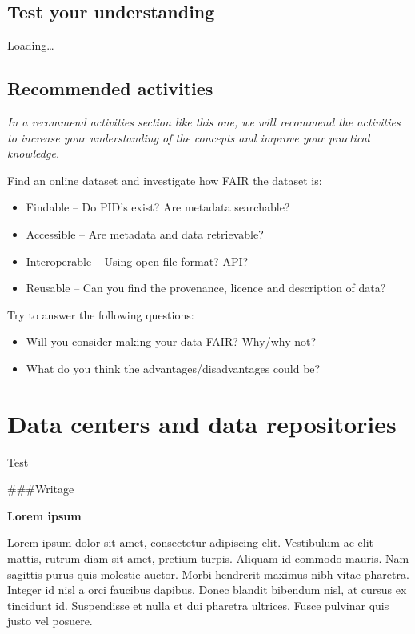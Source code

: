 \documentclass[
]{book}
\providecommand{\tightlist}{%
  \setlength{\itemsep}{0pt}\setlength{\parskip}{0pt}}
\begin{document}
\hypertarget{test-your-understanding}{%
\section{Test your understanding}\label{test-your-understanding}}

Loading\ldots{}

\hypertarget{recommended-activities}{%
\section{Recommended activities}\label{recommended-activities}}

\leavevmode{}%
\emph{In a recommend activities section like this one, we will recommend the activities to increase your understanding of the concepts and improve your practical knowledge.}

Find an online dataset and investigate how FAIR the dataset is:

\begin{itemize}
\tightlist
\item
  Findable -- Do PID's exist? Are metadata searchable?
\item
  Accessible -- Are metadata and data retrievable?
\item
  Interoperable -- Using open file format? API?
\item
  Reusable -- Can you find the provenance, licence and description of data?
\end{itemize}

Try to answer the following questions:

\begin{itemize}
\tightlist
\item
  Will you consider making your data FAIR? Why/why not?
\item
  What do you think the advantages/disadvantages could be?
\end{itemize}

\hypertarget{data-centers-and-data-repositories}{%
\chapter{Data centers and data repositories}\label{data-centers-and-data-repositories}}

Test

\#\#\#Writage

\textbf{Lorem ipsum}

Lorem ipsum dolor sit amet, consectetur adipiscing elit. Vestibulum ac elit mattis, rutrum diam sit amet, pretium turpis. Aliquam id commodo mauris. Nam sagittis purus quis molestie auctor. Morbi hendrerit maximus nibh vitae pharetra. Integer id nisl a orci faucibus dapibus. Donec blandit bibendum nisl, at cursus ex tincidunt id. Suspendisse et nulla et dui pharetra ultrices. Fusce pulvinar quis justo vel posuere.
\end{document}

